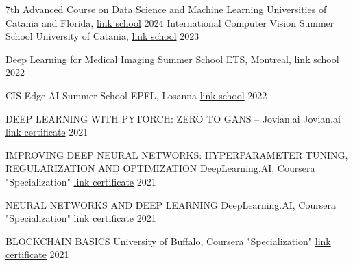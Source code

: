 

\begin{cvhonors}
  \cvhonor
    {7th Advanced Course on Data Science and Machine Learning} %
    {Universities of Catania and Florida, \href{https://acdl2024.icas.events/}{link school}} %
    {} %
    {2024} %
  \cvhonor
    {International Computer Vision Summer School} %
    {University of Catania, \href{https://iplab.dmi.unict.it/icvss2023/}{link school}} %
    {} %
    {2023} %
    
  \cvhonor
    {Deep Learning for Medical Imaging Summer School} %
    {ETS, Montreal, \href{https://event.fourwaves.com/dlmi2022/pages}{link school}} %
    {} %
    {2022} %
    
  \cvhonor
    {CIS Edge AI Summer School} %
    {EPFL, Losanna \href{https://www.epfl.ch/research/domains/cis/center-for-intelligent-systems-cis/events/cis-edge-ai-summer-school/}{link school}} %
    {} %
    {2022} %
    
  \cvhonor
    {DEEP LEARNING WITH PYTORCH: ZERO TO GANS – Jovian.ai} %
    {Jovian.ai \href{https://jovian.com/certificate/MFQTINJVGA}{link certificate}} %
    {} %
    {2021} %

  \cvhonor
    {IMPROVING DEEP NEURAL NETWORKS: HYPERPARAMETER TUNING, REGULARIZATION AND OPTIMIZATION} %
    {DeepLearning.AI, Coursera "Specialization" \href{https://www.coursera.org/account/accomplishments/verify/HRA43JLWKNAT}{link certificate}} %
    {} %
    {2021} %

  \cvhonor
    {NEURAL NETWORKS AND DEEP LEARNING} %
    {DeepLearning.AI, Coursera "Specialization" \href{https://www.coursera.org/account/accomplishments/verify/F9BLUEYK3HUN}{link certificate}} %
    {} %
    {2021} %

  \cvhonor
    {BLOCKCHAIN BASICS} %
    {University of Buffalo, Coursera "Specialization" \href{https://www.coursera.org/account/accomplishments/verify/GKL4ZULKLE4U}{link certificate}} %
    {} %
    {2021} %

\end{cvhonors}
